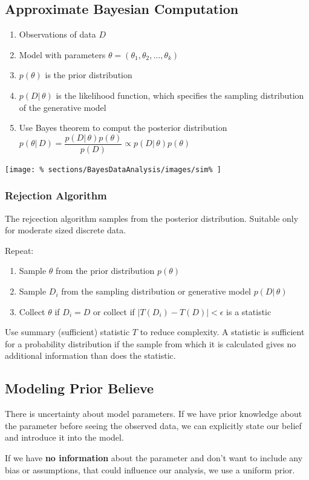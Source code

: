 \subsection{Approximate Bayesian Computation}
\begin{enumerate}
\item Observations of data $D$
\item Model with parameters $\theta=(\theta_1,\theta_2,\ldots,\theta_k)$
\item $p(\theta)$ is the prior distribution
\item $p(D|\,\theta)$ is the likelihood function,
which specifies the sampling distribution of the generative model
\item Use Bayes theorem to comput the posterior distribution
$p(\theta|\,D)
=
\dfrac{p(D|\,\theta) p(\theta)}{p(D)} \varpropto p(D|\,\theta)p(\theta)$
\end{enumerate}
\texttt{[image: \%
sections/BayesDataAnalysis/images/sim\%
]}

\subsubsection{Rejection Algorithm}
The rejcection algorithm samples from the posterior distribution.
Suitable only for moderate sized discrete data.

Repeat:
\begin{enumerate}
\item Sample $\theta$ from the prior distribution $p(\theta)$
\item Sample $D_i$ from the sampling distribution or generative model
$p(D|\,\theta)$
\item Collect $\theta$ if $D_i = D$
or collect if $|T(D_i) - T(D)| < \epsilon$ is a statistic
\end{enumerate}
Use summary (sufficient) statistic $T$ to reduce complexity.
A statistic is sufficient for a probability distribution if the sample from
which it is calculated gives no additional information than does the statistic.

\subsection{Modeling Prior Believe}
There is uncertainty about model parameters.
If we have prior knowledge about the parameter before seeing the observed data,
we can explicitly state our belief and introduce it into the model.

If we have \textbf{no information} about the parameter and
don't want to include any bias or assumptions,
that could influence our analysis,
we use a uniform prior.

